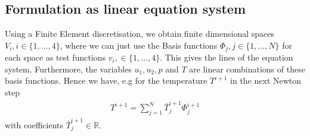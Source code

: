 \documentclass{article}
\begin{document}
\subsection{Formulation as linear equation system}
Using a Finite Element discretisation, we obtain finite dimensional spaces $V_i,i\in\{1,\dots,4\}$, where we can just use the Basis functions $\Phi_j,j\in \{1,\dots,N\}$ for each space as test functions $v_i,\in\{1,\dots,4\}$. This gives the lines of the equation system. Furthermore, the variables $u_1,u_2,p$ and $T$ are linear combinations of these basis functions. Hence we have, e.g for the temperature $T^{i+1}$ in the next Newton step
\begin{align*}
T^{i+1} = \sum\limits_{j=1}^{N} \bar{T}_j^{i+1}\Phi_j^{i+1}
\end{align*}
with coefficients $\bar{T}_j^{i+1} \in \mathbb{R}$. 
\end{document}

